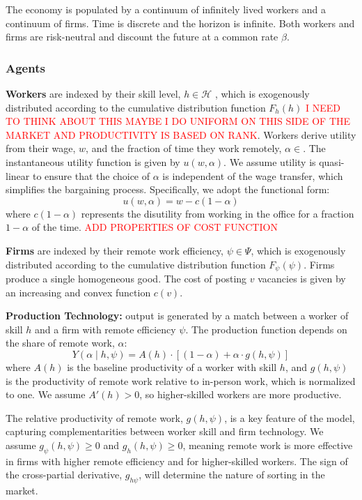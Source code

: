 \documentclass[
  11pt,
  letterpaper,
  DIV=11,
  numbers=noendperiod]{scrartcl}
\begin{document}
The economy is populated by a continuum of infinitely lived workers and
a continuum of firms. Time is discrete and the horizon is infinite. Both
workers and firms are risk-neutral and discount the future at a common
rate \(\beta\).

\subsubsection{Agents}\label{agents}

\textbf{Workers} are indexed by their skill level, \(h \in \mathcal{H}\)
, which is exogenously distributed according to the cumulative
distribution function \(F_h(h)\)
\textcolor{red}{I NEED TO THINK ABOUT THIS MAYBE I DO UNIFORM ON THIS SIDE OF THE MARKET AND PRODUCTIVITY IS BASED ON RANK}.
Workers derive utility from their wage, \(w\), and the fraction of time
they work remotely, \(\alpha \in\). The instantaneous utility function
is given by \(u(w, \alpha)\). We assume utility is quasi-linear to
ensure that the choice of \(\alpha\) is independent of the wage
transfer, which simplifies the bargaining process. Specifically, we
adopt the functional form: \[u(w, \alpha) = w - c(1-\alpha)\] where
\(c(1-\alpha)\) represents the disutility from working in the office for
a fraction \(1-\alpha\) of the time.
\textcolor{red}{ADD PROPERTIES OF COST FUNCTION}

\textbf{Firms} are indexed by their remote work efficiency,
\(\psi \in \Psi\), which is exogenously distributed according to the
cumulative distribution function \(F_\psi(\psi)\). Firms produce a
single homogeneous good. The cost of posting \(v\) vacancies is given by
an increasing and convex function \(c(v)\).

\textbf{Production Technology:} output is generated by a match between a
worker of skill \(h\) and a firm with remote efficiency \(\psi\). The
production function depends on the share of remote work, \(\alpha\):
\[Y(\alpha \mid h, \psi) = A(h) \cdot \left[(1 - \alpha) + \alpha \cdot g(h, \psi)\right]\]
where \(A(h)\) is the baseline productivity of a worker with skill
\(h\), and \(g(h, \psi)\) is the productivity of remote work relative to
in-person work, which is normalized to one. We assume \(A'(h) > 0\), so
higher-skilled workers are more productive.

The relative productivity of remote work, \(g(h, \psi)\), is a key
feature of the model, capturing complementarities between worker skill
and firm technology. We assume \(g_\psi(h, \psi) \geq 0\) and
\(g_h(h, \psi) \geq 0\), meaning remote work is more effective in firms
with higher remote efficiency and for higher-skilled workers. The sign
of the cross-partial derivative, \(g_{h\psi}\), will determine the
nature of sorting in the market.
\end{document}
